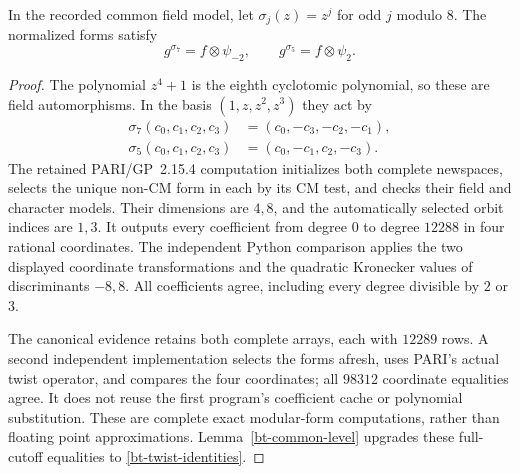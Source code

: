 \begin{theorem}\label{bt-twists}
In the recorded common field model, let $\sigma_j(z)=z^j$ for odd
$j$ modulo $8$. The normalized forms satisfy
\begin{equation}\label{bt-twist-identities}
 g^{\sigma_7}=f\otimes\psi_{-2},\qquad
 g^{\sigma_5}=f\otimes\psi_2.
\end{equation}
\end{theorem}
\begin{proof}
The polynomial $z^4+1$ is the eighth cyclotomic polynomial, so these
are field automorphisms. In the basis $(1,z,z^2,z^3)$ they act by
\begin{align*}
 \sigma_7(c_0,c_1,c_2,c_3)&=(c_0,-c_3,-c_2,-c_1),\\
 \sigma_5(c_0,c_1,c_2,c_3)&=(c_0,-c_1,c_2,-c_3).
\end{align*}
The retained PARI/GP~2.15.4 computation initializes both complete
newspaces, selects the unique non-CM form in each by its CM test,
and checks their field and character models. Their dimensions are
$4,8$, and the automatically selected orbit indices are $1,3$.
It outputs every coefficient from degree $0$ to degree $12288$ in
four rational coordinates. The independent Python comparison applies
the two displayed coordinate transformations and the quadratic
Kronecker values of discriminants $-8,8$. All coefficients agree,
including every degree divisible by $2$ or $3$.

The canonical evidence retains both complete arrays, each with $12289$
rows. A second independent implementation selects the forms afresh,
uses PARI's actual twist operator, and compares the four coordinates;
all $98312$ coordinate equalities agree. It does not reuse the first
program's coefficient cache or polynomial substitution. These are
complete exact modular-form computations, rather than floating point
approximations. Lemma~\ref{bt-common-level} upgrades these full-cutoff
equalities to \eqref{bt-twist-identities}.
\end{proof}


